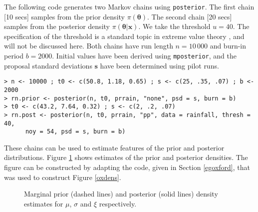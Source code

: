 \documentclass[11pt,a4paper]{article}
\newcommand{\bs}{\boldsymbol}
\begin{document}
The following code generates two Markov chains using \verb+posterior+.
The first chain [10 secs] samples from the prior density $\pi(\bs{\theta})$.
The second chain [20 secs] samples from the posterior density $\pi(\bs{\theta}|\bs{x})$.
We take the threshold $u=40$.
The specification of the threshold is a standard topic in extreme value theory \citep[e.g.][Ch 4]{cole01}, and will not be discussed here. 
Both chains have run length $n=10\,000$ and burn-in period $b=2000$.
Initial values have been derived using \verb+mposterior+, and the proposal standard deviations $\bs{s}$ have been determined using pilot runs.

\begin{verbatim}
> n <- 10000 ; t0 <- c(50.8, 1.18, 0.65) ; s <- c(25, .35, .07) ; b <- 2000
> rn.prior <- posterior(n, t0, prrain, "none", psd = s, burn = b)
> t0 <- c(43.2, 7.64, 0.32) ; s <- c(2, .2, .07)
> rn.post <- posterior(n, t0, prrain, "pp", data = rainfall, thresh = 40, 
      noy = 54, psd = s, burn = b)
\end{verbatim}

These chains can be used to estimate features of the prior and posterior distributions. 
Figure \ref{rainpp} shows estimates of the prior and posterior densities.
The figure can be constructed by adapting the code, given in Section \ref{egoxford}, that was used to construct Figure \ref{oxdens}.


\begin{figure}
\begin{center}
\vspace{-1.5cm}
\hspace{0cm}
\hspace{0cm}
\end{center}
\caption{Marginal prior (dashed lines) and posterior (solid lines) density estimates for $\mu$, $\sigma$ and $\xi$ respectively.}
\label{rainpp}
\end{figure}
\end{document}
